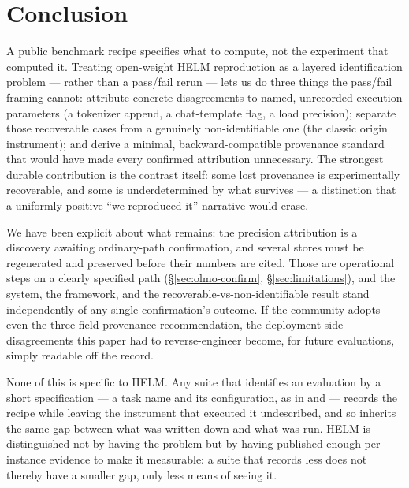 \section{Conclusion}
\label{sec:conclusion}

A public benchmark recipe specifies what to compute, not the experiment that
computed it. Treating open-weight HELM reproduction as a layered
identification problem --- rather than a pass/fail rerun --- lets us do
three things the pass/fail framing cannot: attribute concrete disagreements to
named, unrecorded execution parameters (a tokenizer append, a chat-template flag,
a load precision); separate those recoverable cases from a genuinely
non-identifiable one (the classic origin instrument); and derive a minimal,
backward-compatible provenance standard that would have made every confirmed
attribution unnecessary. The strongest durable contribution is the contrast
itself: some lost provenance is experimentally recoverable, and some is
underdetermined by what survives --- a distinction that a uniformly positive
``we reproduced it'' narrative would erase.

We have been explicit about what remains: the precision attribution is a
discovery awaiting ordinary-path confirmation, and several stores must be
regenerated and preserved before their numbers are cited. Those are operational
steps on a clearly specified path (\S\ref{sec:olmo-confirm},
\S\ref{sec:limitations}), and the system, the framework, and the
recoverable-vs-non-identifiable result stand independently of any single
confirmation's outcome. If the community adopts even the three-field provenance
recommendation, the deployment-side disagreements this paper had to
reverse-engineer become, for future evaluations, simply readable off the record.

None of this is specific to HELM. Any suite that identifies an evaluation by a
short specification --- a task name and its configuration, as in
\citet{eval-harness} and \citet{srivastava2023bigbench} --- records the recipe
while leaving the instrument that executed it undescribed, and so inherits the
same gap between what was written down and what was run. HELM is distinguished
not by having the problem but by having published enough per-instance evidence
to make it measurable: a suite that records less does not thereby have a smaller
gap, only less means of seeing it.

